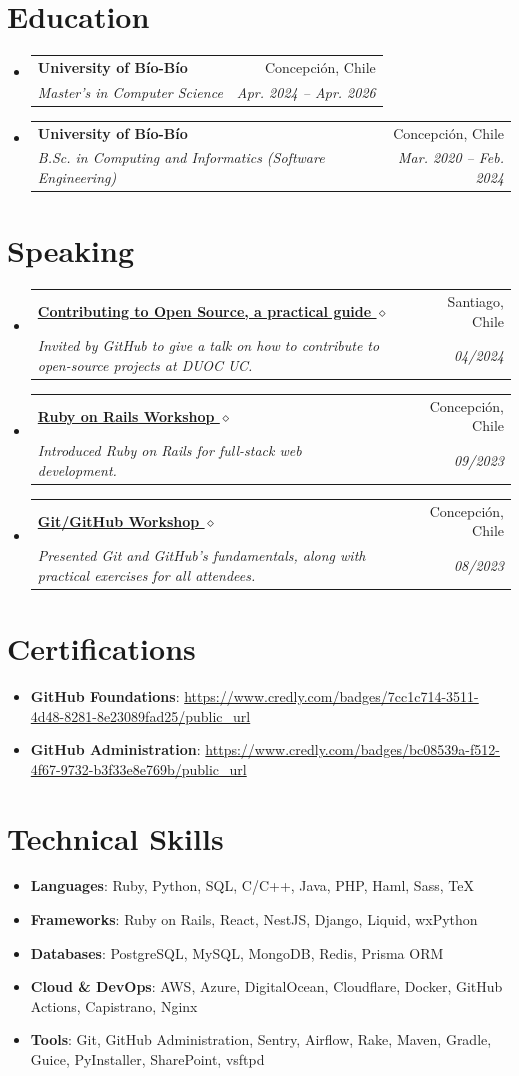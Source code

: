 \documentclass[letterpaper,11pt]{article}
\makeatletter
\newcommand{\resumeSubheading}[4]{
	\vspace{-1pt}\item
	\begin{tabular*}{0.97\textwidth}[t]{l@{\extracolsep{\fill}}r}
		\textbf{#1} & #2 \\
		\textit{\small#3} & \textit{\small #4} \\
	\end{tabular*}\vspace{-5pt}
}
\newcommand{\resumeSubHeadingListStart}{\begin{itemize}[leftmargin=*]}
\newcommand{\resumeSubHeadingListEnd}{\end{itemize}}
\makeatother
\begin{document}
	\section{Education}
	\resumeSubHeadingListStart
	\resumeSubheading
	{University of Bío-Bío}{Concepción, Chile}
	{Master's in Computer Science}{Apr. 2024 -- Apr. 2026}
	\resumeSubheading
	{University of Bío-Bío}{Concepción, Chile}
	{B.Sc. in Computing and Informatics (Software Engineering)}{Mar. 2020 -- Feb. 2024}
	\resumeSubHeadingListEnd
	
	\section{Speaking}
	\resumeSubHeadingListStart
	\resumeSubheading
	{\href{https://youtu.be/S_qkjY7k_L8?t=2698}{Contributing to Open Source, a practical guide $\diamond$}}{Santiago, Chile}
	{Invited by GitHub to give a talk on how to contribute to open-source projects at DUOC UC.}{04/2024}
	\resumeSubheading
	{\href{https://bgm.dev/about}{Ruby on Rails Workshop $\diamond$}}{Concepción, Chile}
	{Introduced Ruby on Rails for full-stack web development.}{09/2023}
	\resumeSubheading
	{\href{https://bgm.dev/about}{Git/GitHub Workshop $\diamond$}}{Concepción, Chile}
	{Presented Git and GitHub's fundamentals, along with practical exercises for all attendees.}{08/2023}
	\resumeSubHeadingListEnd
	
	\section{Certifications}
	\resumeSubHeadingListStart
	\item{
		\textbf{GitHub Foundations}{: \url{https://www.credly.com/badges/7cc1c714-3511-4d48-8281-8e23089fad25/public_url}}
	}
	\item{
		\textbf{GitHub Administration}{: \url{https://www.credly.com/badges/bc08539a-f512-4f67-9732-b3f33e8e769b/public_url}}
	}
	\resumeSubHeadingListEnd
	
	\section{Technical Skills}
	\resumeSubHeadingListStart
	\item{
		\textbf{Languages}{: Ruby, Python, SQL, C/C++, Java, PHP, Haml, Sass, TeX}
	}
	\item{
  \textbf{Frameworks}{: Ruby on Rails, React, NestJS, Django, Liquid, wxPython}
}
	\item{
		\textbf{Databases}{: PostgreSQL, MySQL, MongoDB, Redis, Prisma ORM}
	}
	\item{
		\textbf{Cloud \& DevOps}{: AWS, Azure, DigitalOcean, Cloudflare, Docker, GitHub Actions, Capistrano, Nginx}
	}
	\item{
		\textbf{Tools}{: Git, GitHub Administration, Sentry, Airflow, Rake, Maven, Gradle, Guice, PyInstaller, SharePoint, vsftpd}
	}
	\resumeSubHeadingListEnd
	
\end{document}
